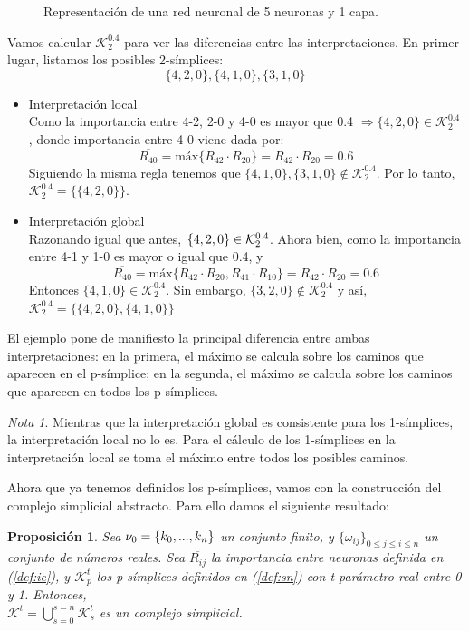 \documentclass[12pt]{article}
\numberwithin{equation}{section}
\theoremstyle{definition}
\newenvironment{ejem}
  {\pushQED{\qed}\renewcommand{\qedsymbol}{$\blacktriangleleft$}\ejemplo}
  {\popQED\endejemplo}
\theoremstyle{remark}
\newtheorem*{remark}{Nota}
\theoremstyle{plain}
\newtheorem{prop}{Proposición}
\begin{document}
\begin{ejem}
\begin{figure}[H]
				\caption{Representación de una red neuronal de 5 neuronas y 1 capa.}
			\end{figure}
			Vamos calcular $\mathcal{K}^{0.4}_{2}$ para ver las diferencias entre las interpretaciones. En primer lugar, 
			listamos los posibles 2-símplices: 
			$$
			\{4,2,0\},\{4,1,0\},\{3,1,0\}
			$$
			\begin{itemize}
				\item{Interpretación local}\\
					Como la importancia entre 4-2, 2-0 y 4-0 es mayor que 0.4 $\Rightarrow\{4,2,0\} \in \mathcal{K}^{0.4}_{2}$,
					donde importancia entre 4-0 viene dada por:
					$$\overline{R_{40}}=\text{máx}\{R_{42} \cdot R_{20}\}=R_{42} \cdot R_{20}=0.6$$
					Siguiendo la misma regla tenemos que $\{4,1,0\},\{3,1,0\} \notin \mathcal{K}^{0.4}_{2}$. Por lo tanto,
					$\mathcal{K}^{0.4}_{2}=\{\{4,2,0\}\}$.
				\item{Interpretación global}\\
					Razonando igual que antes,$\hspace{0.15cm}\{4,2,0\} \in \mathcal{K}^{0.4}_{2}$. Ahora bien, como la importancia
					entre 4-1 y 1-0 es mayor o igual que 0.4, y 
					$$\overline{R_{40}}=\text{máx}\{R_{42} \cdot R_{20},R_{41} \cdot R_{10}\}=R_{42} \cdot R_{20}=0.6$$ 
					Entonces $\{4,1,0\} \in \mathcal{K}^{0.4}_{2}$. Sin embargo, $\{3,2,0\} \notin \mathcal{K}^{0.4}_{2}$ y así,\\ 
					$\mathcal{K}^{0.4}_{2}=\{\{4,2,0\},\{4,1,0\}\}$
			\end{itemize}
			El ejemplo pone de manifiesto la principal diferencia entre ambas interpretaciones: en la primera, el máximo se calcula sobre los caminos
			que aparecen en el p-símplice; en la segunda, el máximo se calcula sobre los caminos que aparecen en todos los p-símplices.
			\begin{remark}
				Mientras que la interpretación global es consistente para los 1-símplices, la interpretación local no lo es. Para el cálculo
				de los 1-símplices en la interpretación local se toma el máximo entre todos los posibles caminos. 
			\end{remark}
		\end{ejem}
		
		Ahora que ya tenemos definidos los p-símplices, vamos con la construcción del complejo simplicial abstracto. Para ello 
		damos el siguiente resultado:
		\begin{prop}
			Sea ${\Large \nu}_{0}=\{k_{0},...,k_{n}\}$ un conjunto finito, y $\{\omega_{ij}\}_{0\leq j \leq i \leq n}$ un 
			conjunto de números reales. Sea $\overline{R_{ij}}$ la importancia entre neuronas 
			definida en (\ref{def:ie}), y $\mathcal{K}_{p}^{t}$ los p-símplices definidos en (\ref{def:sn}) con t
			parámetro real entre 0 y 1. Entonces, \\ 
			$\mathcal{K}^{t}=\bigcup_{s=0}^{s=n}\mathcal{K}_{s}^{t}$ es un complejo simplicial. 
			\label{prop:cs}
		\end{prop}
\end{document}
